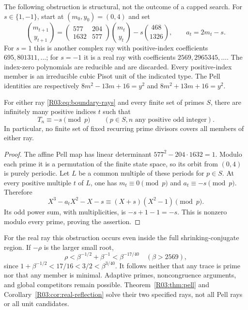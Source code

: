 \documentclass[11pt,a4paper]{article}
\theoremstyle{definition}\newtheorem{definition}[theorem]{Definition}
\theoremstyle{remark}\newtheorem{remark}[theorem]{Remark}
\begin{document}
The following obstruction is structural, not the outcome of a capped
search. For $s\in\{1,-1\}$, start at $(m_0,y_0)=(0,4)$ and set
\begin{equation}\label{R03:eq:boundary-rays}
 \binom{m_{t+1}}{y_{t+1}}=
 \begin{pmatrix}577&204\\1632&577\end{pmatrix}\binom{m_t}{y_t}
 -s\binom{468}{1326},\qquad a_t=2m_t-s.
\end{equation}
For $s=1$ this is another complex ray with positive-index coefficients
$695,801311,\ldots$; for $s=-1$ it is a real ray with coefficients
$2569,2965345,\ldots$. The index-zero polynomials are reducible and
are discarded. Every positive-index member is an irreducible cubic
Pisot unit of the indicated type. The Pell identities are respectively
$8m^2-13m+16=y^2$ and $8m^2+13m+16=y^2$.

\begin{proposition}\label{R03:prop:nogo}
For either ray \eqref{R03:eq:boundary-rays} and every finite set of primes
$S$, there are infinitely many positive indices $t$ such that
\[
 T_n\equiv-s\pmod p\qquad(p\in S, n\text{ any positive odd integer}).
\]
In particular, no finite set of fixed recurring prime divisors covers
all members of either ray.
\end{proposition}
\begin{proof}
The affine Pell map has linear determinant
$577^2-204\cdot1632=1$. Modulo each prime it is a permutation of the
finite state space, so its orbit from $(0,4)$ is purely periodic.
Let $L$ be a common multiple of these periods for $p\in S$.
At every positive multiple $t$ of $L$, one has $m_t\equiv0\pmod p$
and $a_t\equiv-s\pmod p$. Therefore
\[
 X^3-a_tX^2-X-s\equiv(X+s)(X^2-1)\pmod p.
\]
Its odd power sum, with multiplicities, is $-s+1-1=-s$.
This is nonzero modulo every prime, proving the assertion.
\end{proof}

For the real ray this obstruction occurs even inside the full
shrinking-conjugate region. If $-\rho$ is the larger small root,
\[
 \rho<\beta^{-1/2}+\beta^{-1}<\beta^{-17/40}
 \quad(\beta>2569),
\]
since $1+\beta^{-1/2}<17/16<3/2<\beta^{3/40}$.
It follows neither that any trace is prime nor that any member is
minimal. Adaptive primes, noncongruence arguments, and global
competitors remain possible. Theorem~\ref{R03:thm:pell} and
Corollary~\ref{R03:cor:real-reflection} solve their two specified rays,
not all Pell rays or all unit candidates.
\end{document}

